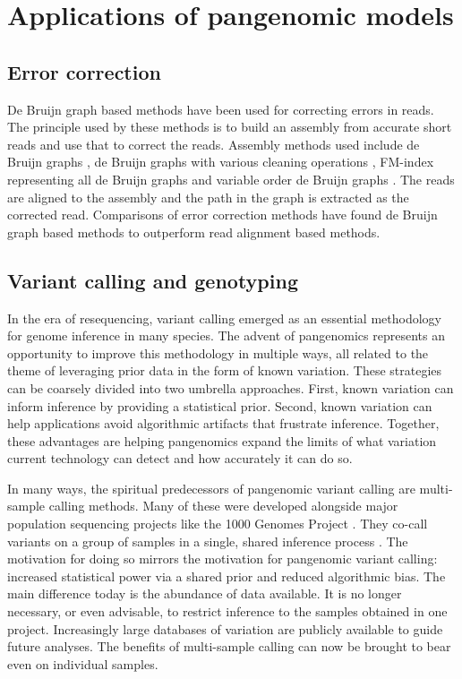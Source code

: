 \section{Applications of pangenomic models}

\subsection{Error correction}

De Bruijn graph based methods have been used for correcting errors in reads.
The principle used by these methods is to build an assembly from accurate short reads and use that to correct the reads.
Assembly methods used include de Bruijn graphs \cite{Salmela2014LoRDEC, Salmela2016LORMA}, de Bruijn graphs with various cleaning operations \cite{Miclotte2016Jabba, Limasset_2019, Rautiainen_2019b, Marchet_2019}, FM-index representing all de Bruijn graphs \cite{Wang2018FMLRC} and variable order de Bruijn graphs \cite{Morisse2018HGcolor, Morisse2019Consent}.
The reads are aligned to the assembly and the path in the graph is extracted as the corrected read.
Comparisons of error correction methods \cite{Fu2019ErrorCorrectionSurvey, Zhang2019ErrorCorrectionSurvey} have found de Bruijn graph based methods to outperform read alignment based methods.

\subsection{Variant calling and genotyping}

In the era of resequencing, variant calling emerged as an essential methodology for genome inference in many species.
The advent of pangenomics represents an opportunity to improve this methodology in multiple ways, all related to the theme of leveraging prior data in the form of known variation.
These strategies can be coarsely divided into two umbrella approaches.
First, known variation can inform inference by providing a statistical prior.
Second, known variation can help applications avoid algorithmic artifacts that frustrate inference.
Together, these advantages are helping pangenomics expand the limits of what variation current technology can detect and how accurately it can do so.

In many ways, the spiritual predecessors of pangenomic variant calling are multi-sample calling methods. 
Many of these were developed alongside major population sequencing projects like the 1000 Genomes Project \cite{1000_2015}.
They co-call variants on a group of samples in a single, shared inference process \cite{Li_2011,Garrison_2012}.
The motivation for doing so mirrors the motivation for pangenomic variant calling: increased statistical power via a shared prior and reduced algorithmic bias.
The main difference today is the abundance of data available.
It is no longer necessary, or even advisable, to restrict inference to the samples obtained in one project.
Increasingly large databases of variation are publicly available to guide future analyses.
The benefits of multi-sample calling can now be brought to bear even on individual samples.

